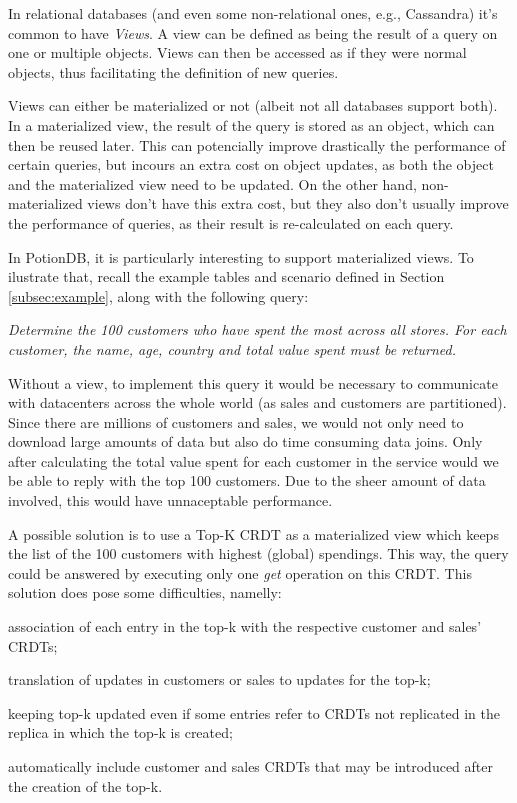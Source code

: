 \documentclass{vldb}
\begin{document}
In relational databases (and even some non-relational ones, e.g., Cassandra) it's common to have \emph{Views}. 
A view can be defined as being the result of a query on one or multiple objects.
Views can then be accessed as if they were normal objects, thus facilitating the definition of new queries.

Views can either be materialized or not (albeit not all databases support both). %
In a materialized view, the result of the query is stored as an object, which can then be reused later.
This can potencially improve drastically the performance of certain queries, but incours an extra cost on object updates, as both the object and the materialized view need to be updated.
On the other hand, non-materialized views don't have this extra cost, but they also don't usually improve the performance of queries, as their result is re-calculated on each query.

In PotionDB, it is particularly interesting to support materialized views.
To ilustrate that, recall the example tables and scenario defined in Section \ref{subsec:example}, along with the following query: 

\emph{Determine the 100 customers who have spent the most across all stores. For each customer, the name, age, country and total value spent must be returned.}

Without a view, to implement this query it would be necessary to communicate with datacenters across the whole world (as sales and customers are partitioned). 
Since there are millions of customers and sales, we would not only need to download large amounts of data but also do time consuming data joins.
Only after calculating the total value spent for each customer in the service would we be able to reply with the top 100 customers.
Due to the sheer amount of data involved, this would have unnaceptable performance.

A possible solution is to use a Top-K CRDT %
as a materialized view which keeps the list of the 100 customers with highest (global) spendings.
This way, the query could be answered by executing only one \emph{get} operation on this CRDT.
This solution does pose some difficulties, namelly: 
\begin{enumerate*}[label=(\roman*)]
	\item association of each entry in the top-k with the respective customer and sales' CRDTs;
	\item translation of updates in customers or sales to updates for the top-k;
	\item keeping top-k updated even if some entries refer to CRDTs not replicated in the replica in which the top-k is created;
	\item automatically include customer and sales CRDTs that may be introduced after the creation of the top-k.
\end{enumerate*}
\end{document}
